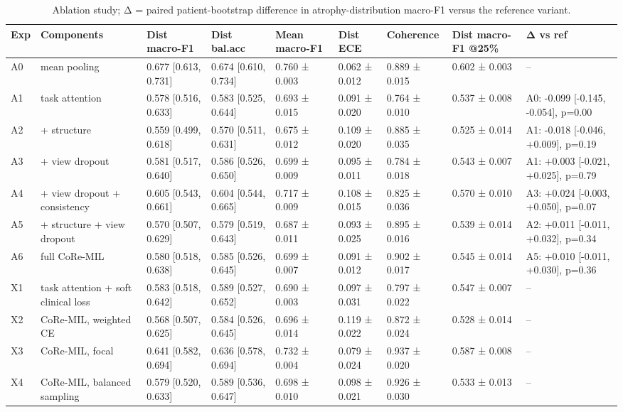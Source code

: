 \begin{table}
\caption{Ablation study; Δ = paired patient-bootstrap difference in atrophy-distribution macro-F1 versus the reference variant.}
\label{tab:table5_ablation}
\begin{tabular}{lllllllll}
\toprule
Exp & Components & Dist macro-F1 & Dist bal.acc & Mean macro-F1 & Dist ECE & Coherence & Dist macro-F1 @25\% & Δ vs ref \\
\midrule
A0 & mean pooling & 0.677 [0.613, 0.731] & 0.674 [0.610, 0.734] & 0.760 ± 0.003 & 0.062 ± 0.012 & 0.889 ± 0.015 & 0.602 ± 0.003 & -- \\
A1 & task attention & 0.578 [0.516, 0.633] & 0.583 [0.525, 0.644] & 0.693 ± 0.015 & 0.091 ± 0.020 & 0.764 ± 0.010 & 0.537 ± 0.008 & A0: -0.099 [-0.145, -0.054], p=0.00 \\
A2 & + structure & 0.559 [0.499, 0.618] & 0.570 [0.511, 0.631] & 0.675 ± 0.012 & 0.109 ± 0.020 & 0.885 ± 0.035 & 0.525 ± 0.014 & A1: -0.018 [-0.046, +0.009], p=0.19 \\
A3 & + view dropout & 0.581 [0.517, 0.640] & 0.586 [0.526, 0.650] & 0.699 ± 0.009 & 0.095 ± 0.011 & 0.784 ± 0.018 & 0.543 ± 0.007 & A1: +0.003 [-0.021, +0.025], p=0.79 \\
A4 & + view dropout + consistency & 0.605 [0.543, 0.661] & 0.604 [0.544, 0.665] & 0.717 ± 0.009 & 0.108 ± 0.015 & 0.825 ± 0.036 & 0.570 ± 0.010 & A3: +0.024 [-0.003, +0.050], p=0.07 \\
A5 & + structure + view dropout & 0.570 [0.507, 0.629] & 0.579 [0.519, 0.643] & 0.687 ± 0.011 & 0.093 ± 0.025 & 0.895 ± 0.016 & 0.539 ± 0.014 & A2: +0.011 [-0.011, +0.032], p=0.34 \\
A6 & full CoRe-MIL & 0.580 [0.518, 0.638] & 0.585 [0.526, 0.645] & 0.699 ± 0.007 & 0.091 ± 0.012 & 0.902 ± 0.017 & 0.545 ± 0.014 & A5: +0.010 [-0.011, +0.030], p=0.36 \\
X1 & task attention + soft clinical loss & 0.583 [0.518, 0.642] & 0.589 [0.527, 0.652] & 0.690 ± 0.003 & 0.097 ± 0.031 & 0.797 ± 0.022 & 0.547 ± 0.007 & -- \\
X2 & CoRe-MIL, weighted CE & 0.568 [0.507, 0.625] & 0.584 [0.526, 0.645] & 0.696 ± 0.014 & 0.119 ± 0.022 & 0.872 ± 0.024 & 0.528 ± 0.014 & -- \\
X3 & CoRe-MIL, focal & 0.641 [0.582, 0.694] & 0.636 [0.578, 0.694] & 0.732 ± 0.004 & 0.079 ± 0.024 & 0.937 ± 0.020 & 0.587 ± 0.008 & -- \\
X4 & CoRe-MIL, balanced sampling & 0.579 [0.520, 0.633] & 0.589 [0.536, 0.647] & 0.698 ± 0.010 & 0.098 ± 0.021 & 0.926 ± 0.030 & 0.533 ± 0.013 & -- \\

\end{tabular}
\end{table}
